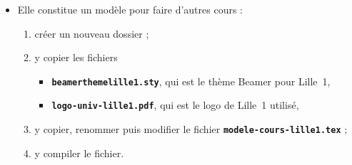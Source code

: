   \begin{itemize}
  \item Elle constitue un modèle pour faire d'autres cours :
      
    \begin{enumerate}
    \item créer un nouveau dossier ;
    \item y copier les fichiers 
      
      \begin{itemize}
      \item \texttt{\textbf{beamerthemelille1.sty}}, qui est le thème Beamer pour Lille~1,
      \item \texttt{\textbf{logo-univ-lille1.pdf}}, qui est le logo de Lille~1 utilisé,
      \end{itemize}
      
    \item y copier, renommer puis modifier le fichier \texttt{\textbf{modele-cours-lille1.tex}} ;
    \item y compiler le fichier.
    \end{enumerate}
  \end{itemize}
